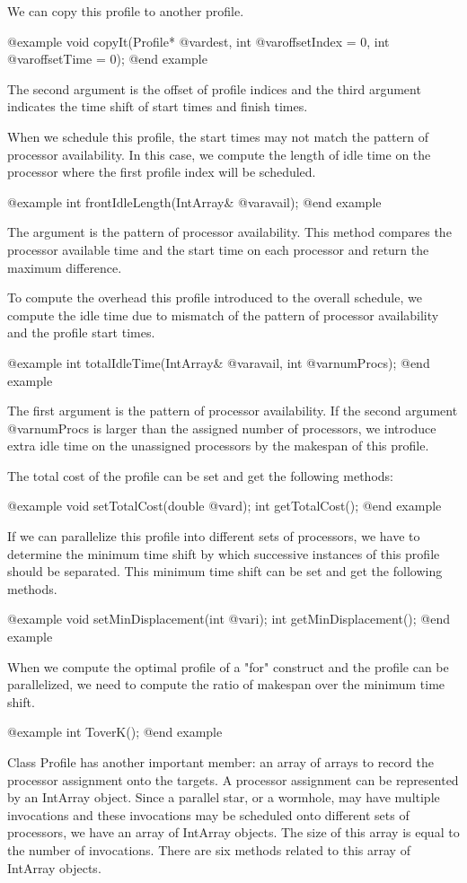 {We can copy this profile to another profile.

@example
void copyIt(Profile* @var{dest}, int @var{offsetIndex} = 0, int @var{offsetTime} = 0);
@end example

The second argument is the offset of profile indices and the third argument
indicates the time shift of start times and finish times.

When we schedule this profile, the start times may not match the pattern
of processor availability. In this case, we compute the length of idle
time on the processor where the first profile index will be scheduled.

@example
int frontIdleLength(IntArray& @var{avail});
@end example

The argument is the pattern of processor availability. This method
compares the processor available time and the start time on each
processor and return the maximum difference.

To compute the overhead this profile introduced to the overall schedule,
we compute the idle time due to mismatch of the pattern of
processor availability and the profile start times.

@example
int totalIdleTime(IntArray& @var{avail}, int @var{numProcs});
@end example

The first argument is the pattern of processor availability. If the
second argument @var{numProcs} is larger than the assigned number
of processors, we introduce extra idle time on the unassigned processors
by the makespan of this profile.

The total cost of the profile can be set and get the following methods:

@example
void setTotalCost(double @var{d});
int getTotalCost();
@end example

If we can parallelize this profile into different sets of processors,
we have to determine the minimum time shift by which successive instances of
this profile should be separated. This minimum time shift can be
set and get the following methods.

@example
void setMinDisplacement(int @var{i});
int getMinDisplacement();
@end example

When we compute the optimal profile of a "for" construct and 
the profile can be parallelized, we need to 
compute the ratio of makespan over the minimum time shift.

@example
int ToverK();
@end example

Class Profile has another important member: an array of arrays to
record the processor assignment onto the targets. A processor
assignment can be represented by an IntArray object. Since a
parallel star, or a wormhole, may have multiple invocations and
these invocations may be scheduled onto different sets of processors,
we have an array of IntArray objects. The size of this array is equal to
the number of invocations. There are six methods related to this array of
IntArray objects.

}
